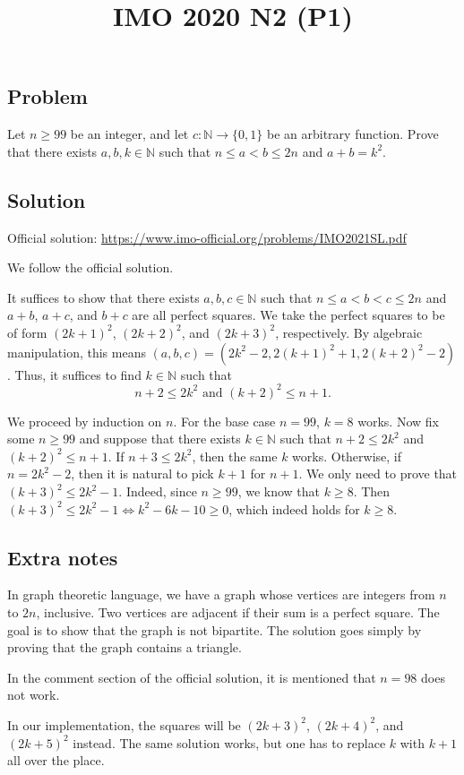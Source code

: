 \documentclass{article}
\title{IMO 2020 N2 (P1)}
\author{}
\date{}
\newcommand{\N}{\mathbb{N}}
\begin{document}
\maketitle



\subsection*{Problem}

Let $n \geq 99$ be an integer, and let $c : \N \to \{0, 1\}$ be an arbitrary function.
Prove that there exists $a, b, k \in \N$ such that $n \leq a < b \leq 2n$ and $a + b = k^2$.



\subsection*{Solution}

Official solution: \url{https://www.imo-official.org/problems/IMO2021SL.pdf}

We follow the official solution.

It suffices to show that there exists $a, b, c \in \N$ such that $n \leq a < b < c \leq 2n$ and $a + b$, $a + c$, and $b + c$ are all perfect squares.
We take the perfect squares to be of form $(2k + 1)^2$, $(2k + 2)^2$, and $(2k + 3)^2$, respectively.
By algebraic manipulation, this means $(a, b, c) = (2k^2 - 2, 2(k + 1)^2 + 1, 2(k + 2)^2 - 2)$.
Thus, it suffices to find $k \in \N$ such that
\[ n + 2 \leq 2k^2 \text{ and } (k + 2)^2 \leq n + 1. \]

We proceed by induction on $n$.
For the base case $n = 99$, $k = 8$ works.
Now fix some $n \geq 99$ and suppose that there exists $k \in \N$ such that $n + 2 \leq 2k^2$ and $(k + 2)^2 \leq n + 1$.
If $n + 3 \leq 2k^2$, then the same $k$ works.
Otherwise, if $n = 2k^2 - 2$, then it is natural to pick $k + 1$ for $n + 1$.
We only need to prove that $(k + 3)^2 \leq 2k^2 - 1$.
Indeed, since $n \geq 99$, we know that $k \geq 8$.
Then $(k + 3)^2 \leq 2k^2 - 1 \iff k^2 - 6k - 10 \geq 0$, which indeed holds for $k \geq 8$.



\subsection*{Extra notes}

In graph theoretic language, we have a graph whose vertices are integers from $n$ to $2n$, inclusive.
Two vertices are adjacent if their sum is a perfect square.
The goal is to show that the graph is not bipartite.
The solution goes simply by proving that the graph contains a triangle.

In the comment section of the official solution, it is mentioned that $n = 98$ does not work.

In our implementation, the squares will be $(2k + 3)^2$, $(2k + 4)^2$, and $(2k + 5)^2$ instead.
The same solution works, but one has to replace $k$ with $k + 1$ all over the place.
\end{document}

